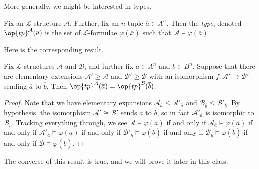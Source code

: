 \documentclass[../notes.tex]{subfiles}
\begin{document}
More generally, we might be interested in types.
\begin{definition}[type]
	Fix an $\mathcal L$-structure $\mathcal A$. Further, fix an $n$-tuple $\overline a\in A^n$. Then the \textit{type}, denoted $\op{tp}^\mathcal A(\overline a)$ is the set of $\mathcal L$-formulae $\varphi(\overline x)$ such that $\mathcal A\models\varphi(\overline a)$.
\end{definition}
Here is the corresponding result.
\begin{lemma} \label{lem:how-to-get-same-type}
	Fix $\mathcal L$-structures $\mathcal A$ and $\mathcal B$, and further fix $a\in A^n$ and $b\in B^n$. Suppose that there are elementary extensions $\mathcal A'\ge\mathcal A$ and $\mathcal B'\ge\mathcal B$ with an isomorphism $f\colon\mathcal A'\to\mathcal B'$ sending $\overline a$ to $\overline b$. Then $\op{tp}^\mathcal A(\overline a)=\op{tp}^\mathcal B(\overline b)$.
\end{lemma}
\begin{proof}
	Note that we have elementary expansions $\mathcal A_{\overline a}\le\mathcal A'_{\overline a}$ and $\mathcal B_{\overline b}\le\mathcal B'_{\overline b}$.
	By hypothesis, the isomorphism $\mathcal A'\cong\mathcal B'$ sends $\overline a$ to $\overline b$, so in fact $\mathcal A'_{\overline a}$ is isomorphic to $\mathcal B_{\overline b}$.
	Tracking everything through, we see $\mathcal A\models\varphi(\overline a)$ if and only if $\mathcal A_{\overline a}\models\varphi(\overline a)$ if and only if $\mathcal A'_{\overline a}\models\varphi(\overline a)$ if and only if $\mathcal B'_{\overline b}\models\varphi(\overline b)$ if and only if $\mathcal B_{\overline b}\models\varphi(\overline b)$ if and only if $\mathcal B\models\varphi(\overline b)$.
\end{proof}
\begin{remark}
	The converse of this result is true, and we will prove it later in this class.
\end{remark}
\end{document}

